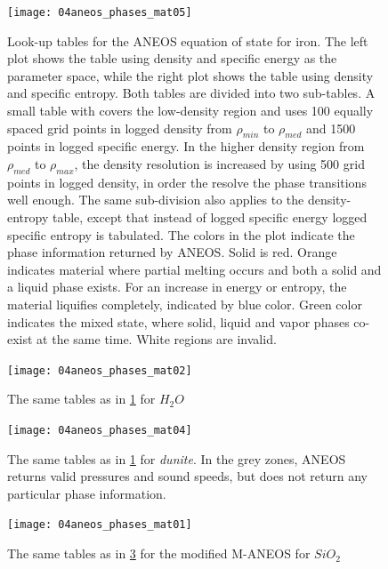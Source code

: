 \begin{figure}
\begin{center}
\texttt{[image: 04aneos\_phases\_mat05]}
\caption{Look-up tables for the ANEOS equation of state for iron. The left plot shows the table using density and specific energy as the parameter space, while the right plot shows the table using density and specific entropy. Both tables are divided into two sub-tables. A small table with covers the low-density region and uses 100 equally spaced grid points in logged density from $\rho_{min}$ to $\rho_{med}$ and 1500 points in logged specific energy. In the higher density region from $\rho_{med}$ to $\rho_{max}$, the density resolution is increased by using 500 grid points in logged density, in order the resolve the phase transitions well enough. The same sub-division also applies to the density-entropy table, except that instead of logged specific energy logged specific entropy is tabulated. The colors in the plot indicate the phase information returned by ANEOS. Solid is red. Orange indicates material where partial melting occurs and both a solid and a liquid phase exists. For an increase in energy or entropy, the material liquifies completely, indicated by blue color. Green color indicates the mixed state, where solid, liquid and vapor phases co-exist at the same time. White regions are invalid.}
\label{ch02_eos02_fig02}
\end{center}
\end{figure}

\begin{figure}
\begin{center}
\texttt{[image: 04aneos\_phases\_mat02]}
\caption{The same tables as in \ref{ch02_eos02_fig02} for $H_2 O$ }
\label{ch02_eos02_fig03}
\end{center}
\end{figure}

\begin{figure}
\begin{center}
\texttt{[image: 04aneos\_phases\_mat04]}
\caption{The same tables as in \ref{ch02_eos02_fig02} for \emph{dunite}. In the grey zones, ANEOS returns valid pressures and sound speeds, but does not return any particular phase information.}
\label{ch02_eos02_fig04}
\end{center}
\end{figure}

\begin{figure}
\begin{center}
\texttt{[image: 04aneos\_phases\_mat01]}
\caption{The same tables as in \ref{ch02_eos02_fig04} for the modified M-ANEOS for $SiO_2$}
\label{ch02_eos02_fig05}
\end{center}
\end{figure}



